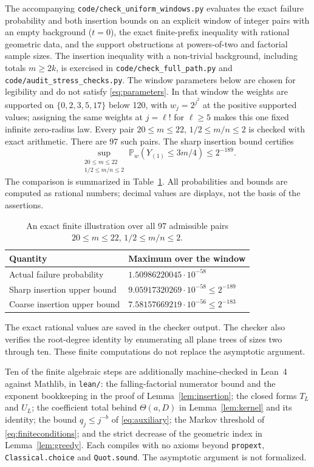 \documentclass[11pt]{amsart}
\theoremstyle{remark}\newtheorem{remark}[theorem]{Remark}
\newcommand{\Pp}{\mathbb P}
\begin{document}
The accompanying \texttt{code/check\_uniform\_windows.py} evaluates the exact
failure probability and both insertion bounds on an explicit window of integer
pairs with an empty background ($t=0$), the exact finite-prefix inequality with
rational geometric data, and the support obstructions at powers-of-two and
factorial sample sizes. The insertion inequality with a non-trivial background,
including totals $m\ge2k$, is exercised in \texttt{code/check\_full\_path.py}
and \texttt{code/audit\_stress\_checks.py}. The window parameters below are
chosen for legibility and do not satisfy \eqref{eq:parameters}. In that window
the
weights are supported on $\{0,2,3,5,17\}$ below 120, with
$w_j=2^{j^2}$ at the positive supported values; assigning the same weights
at $j=\ell!$ for $\ell\ge5$ makes this one fixed infinite zero-radius law.
Every pair $20\le m\le22$, $1/2\le m/n\le2$ is checked with exact arithmetic.
There are 97 such pairs. The sharp insertion bound certifies
\[
 \sup_{\substack{20\le m\le22\\1/2\le m/n\le2}}
 \Pp_w(Y_{(1)}\le3m/4)\le2^{-189}.
\]
The comparison is summarized in Table~\ref{tab:finite}. All probabilities
and bounds are computed as rational numbers; decimal values are displays,
not the basis of the assertions.
\begin{table}[ht]
\centering
\caption{An exact finite illustration over all 97 admissible pairs
$20\le m\le22$, $1/2\le m/n\le2$.}\label{tab:finite}
\begin{tabular}{@{}ll@{}}
\toprule
Quantity & Maximum over the window \\
\midrule
Actual failure probability & $1.50986220045\cdot10^{-58}$ \\
Sharp insertion upper bound & $9.05917320269\cdot10^{-58}\le2^{-189}$ \\
Coarse insertion upper bound & $7.58157669219\cdot10^{-56}\le2^{-183}$ \\
\bottomrule
\end{tabular}
\end{table}
The exact rational values are saved in the checker output. The
checker also verifies the root-degree identity by enumerating all plane
trees of sizes two through ten.
These finite computations do not replace the asymptotic argument.

Ten of the finite algebraic steps are additionally machine-checked in Lean~4
against Mathlib, in \texttt{lean/}: the falling-factorial numerator bound and
the exponent bookkeeping in the proof of Lemma~\ref{lem:insertion}; the closed
forms $T_L$ and $U_L$; the coefficient total behind $\Theta(a,D)$ in
Lemma~\ref{lem:kernel} and its identity; the bound $q_j\le j^{-b}$ of
\eqref{eq:auxiliary}; the Markov threshold of \eqref{eq:finiteconditions}; and
the strict decrease of the geometric index in Lemma~\ref{lem:greedy}. Each
compiles with no axioms beyond \texttt{propext}, \texttt{Classical.choice} and
\texttt{Quot.sound}. The asymptotic argument is not formalized.
\end{document}
